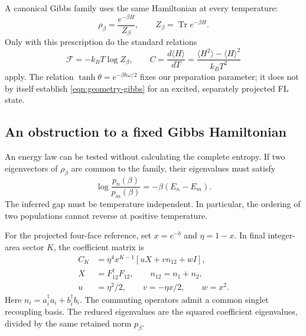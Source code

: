 \documentclass[twocolumn,draft,aps,nofootinbib,nobibnotes,final]{revtex4-2}
\begin{document}
A canonical Gibbs family uses the same Hamiltonian at every temperature:
\begin{equation}\label{eqn:geometry-gibbs}
 \rho_\beta=\frac{e^{-\beta H}}{Z_\beta},\qquad
 Z_\beta=\operatorname{Tr}e^{-\beta H}.
\end{equation}
Only with this prescription do the standard relations
\begin{equation}
 \mathcal F=-k_BT\log Z_\beta,\qquad
 C=\frac{d\langle H\rangle}{dT}
 =\frac{\langle H^2\rangle-\langle H\rangle^2}{k_BT^2}
\end{equation}
apply. The relation $\tanh\theta=e^{-\beta\hbar\omega/2}$ fixes our preparation parameter; it does not by itself establish \eqref{eqn:geometry-gibbs} for an excited, separately projected FL state.

\subsection{An obstruction to a fixed Gibbs Hamiltonian}

An energy law can be tested without calculating the complete entropy. If two eigenvectors of $\rho_\beta$ are common to the family, their eigenvalues must satisfy
\begin{equation}
 \log\frac{p_n(\beta)}{p_m(\beta)}
 =-\beta(E_n-E_m).
\end{equation}
The inferred gap must be temperature independent. In particular, the ordering of two populations cannot reverse at positive temperature.

For the projected four-face reference, set $x=e^{-b}$ and $\eta=1-x$. In final integer-area sector $K$, the coefficient matrix is
\begin{equation}\label{eqn:closed-coefficient-polynomial}
\begin{aligned}
 C_K&=\eta^4x^{K-1}[uX+v n_{12}+wI],\\
 X&=F_{12}^{\dagger}F_{12},\qquad n_{12}=n_1+n_2,\\
 u&=\eta^2/2,\qquad v=-\eta x/2,\qquad w=x^2.
\end{aligned}
\end{equation}
Here $n_i=a_i^\dagger a_i+b_i^\dagger b_i$. The commuting operators admit a common singlet recoupling basis. The reduced eigenvalues are the squared coefficient eigenvalues, divided by the same retained norm $p_\beta$.
\end{document}
